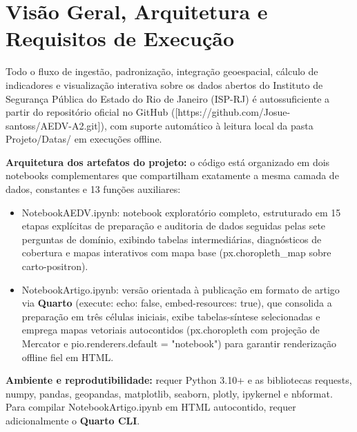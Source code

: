 \documentclass[11pt,a4paper]{article}
\newcommand{\code}[1]{{\ttfamily\footnotesize\allowbreak #1}}
\begin{document}
\begin{abstract}
Esta documentação descreve a arquitetura computacional dos dois notebooks do projeto (\code{NotebookAEDV.ipynb} e \code{NotebookArtigo.ipynb}), o pipeline completo de preparação e tratamento de dados, as decisões metodológicas de código, de design visual e de interpretação descritiva, além da referência integral das 13 funções implementadas.
\end{abstract}

\tableofcontents
\vspace{8pt}

\section{Visão Geral, Arquitetura e Requisitos de Execução}

Todo o fluxo de ingestão, padronização, integração geoespacial, cálculo de indicadores e visualização interativa sobre os dados abertos do Instituto de Segurança Pública do Estado do Rio de Janeiro (ISP-RJ) é autossuficiente a partir do repositório oficial no GitHub ([https://github.com/Josue-santoss/AEDV-A2.git]), com suporte automático à leitura local da pasta \code{Projeto/Datas/} em execuções offline.

\textbf{Arquitetura dos artefatos do projeto:} o código está organizado em dois notebooks complementares que compartilham exatamente a mesma camada de dados, constantes e 13 funções auxiliares:
\begin{itemize}
  \setlength{\itemsep}{2pt}\setlength{\parskip}{0pt}
  \item \code{NotebookAEDV.ipynb}: notebook exploratório completo, estruturado em 15 etapas explícitas de preparação e auditoria de dados seguidas pelas sete perguntas de domínio, exibindo tabelas intermediárias, diagnósticos de cobertura e mapas interativos com mapa base (\code{px.choropleth\_map} sobre \code{carto-positron}).
  \item \code{NotebookArtigo.ipynb}: versão orientada à publicação em formato de artigo via \textbf{Quarto} (\code{execute: echo: false}, \code{embed-resources: true}), que consolida a preparação em três células iniciais, exibe tabelas-síntese selecionadas e emprega mapas vetoriais autocontidos (\code{px.choropleth} com projeção de Mercator e \code{pio.renderers.default = "notebook"}) para garantir renderização offline fiel em HTML.
\end{itemize}

\textbf{Ambiente e reprodutibilidade:} requer Python 3.10+ e as bibliotecas \code{requests}, \code{numpy}, \code{pandas}, \code{geopandas}, \code{matplotlib}, \code{seaborn}, \code{plotly}, \code{ipykernel} e \code{nbformat}. Para compilar \code{NotebookArtigo.ipynb} em HTML autocontido, requer adicionalmente o \textbf{Quarto CLI}.
\end{document}
